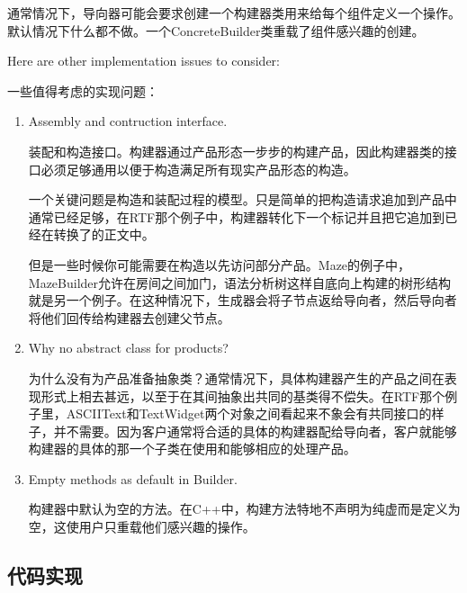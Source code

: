 通常情况下，导向器可能会要求创建一个构建器类用来给每个组件定义一个操作。默认情况下什么都不做。一个ConcreteBuilder类重载了组件感兴趣的创建。

Here are other implementation issues to consider:

一些值得考虑的实现问题：

\begin{enumerate}

\item Assembly and contruction interface.

	  装配和构造接口。构建器通过产品形态一步步的构建产品，因此构建器类的接口必须足够通用以便于构造满足所有现实产品形态的构造。

	  一个关键问题是构造和装配过程的模型。只是简单的把构造请求追加到产品中通常已经足够，在RTF那个例子中，构建器转化下一个标记并且把它追加到已经在转换了的正文中。

	  但是一些时候你可能需要在构造以先访问部分产品。Maze的例子中，MazeBuilder允许在房间之间加门，语法分析树这样自底向上构建的树形结构就是另一个例子。在这种情况下，生成器会将子节点返给导向者，然后导向者将他们回传给构建器去创建父节点。

\item Why no abstract class for products?

	  为什么没有为产品准备抽象类？通常情况下，具体构建器产生的产品之间在表现形式上相去甚远，以至于在其间抽象出共同的基类得不偿失。在RTF那个例子里，ASCIIText和TextWidget两个对象之间看起来不象会有共同接口的样子，并不需要。因为客户通常将合适的具体的构建器配给导向者，客户就能够构建器的具体的那一个子类在使用和能够相应的处理产品。

\item Empty methods as default in Builder.

      构建器中默认为空的方法。在C++中，构建方法特地不声明为纯虚而是定义为空，这使用户只重载他们感兴趣的操作。

\end{enumerate}

\subsection{代码实现}


